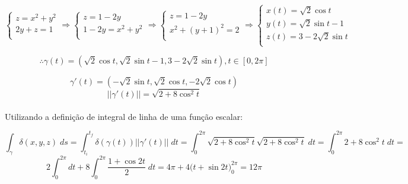 \documentclass[12pt,a4paper]{article}
\begin{document}
$$
\begin{cases}
z = x^2 + y^2 \\
2y + z = 1 \\
\end{cases}
\Rightarrow
\begin{cases}
z = 1 - 2y\\
1 - 2y = x^2 + y^2 \\
\end{cases}
\Rightarrow
\begin{cases}
z = 1 - 2y\\
 x^2 + (y+1)^2 = 2 \\
\end{cases}
\Rightarrow
\begin{cases}
x(t) = \sqrt{2}\cos t \\
y(t) = \sqrt{2}\sin t -1\\
z(t) = 3 - 2\sqrt{2}\sin t \\
\end{cases}
$$

\begin{equation}
\therefore \gamma(t) = (\sqrt{2}\cos t, \sqrt{2}\sin t -1, 3 - 2\sqrt{2}\sin t), t \in [0,2\pi]
\label{Q3_parametrizacao}
\end{equation}

$$ \gamma'(t) = (-\sqrt{2}\sin t, \sqrt{2}\cos t , - 2\sqrt{2}\cos t) $$
$$ ||\gamma'(t)|| = \sqrt{2 + 8\cos^2 t} $$ \\

Utilizando a definiç\~{a}o de integral de linha de uma função escalar:

$$  \int_{\gamma}{\delta(x,y,z)}\;ds = \int_{t_i}^{t_f} {\delta(\gamma(t)) ||\gamma'(t) ||}\;dt = \int_{0}^{2\pi} {\sqrt{2 + 8\cos^2 t} \sqrt{2 + 8\cos^2 t}}\;dt = \int_{0}^{2\pi} {2 + 8\cos^2 t}\;dt =  $$
$$ 2\int_{0}^{2\pi} dt + 8\int_{0}^{2\pi} {\frac{1+\cos 2t}{2}}\;dt = 4\pi + 4 \Big( t + \sin 2t \Big)_0^{2\pi} = 12\pi $$
\end{document}
